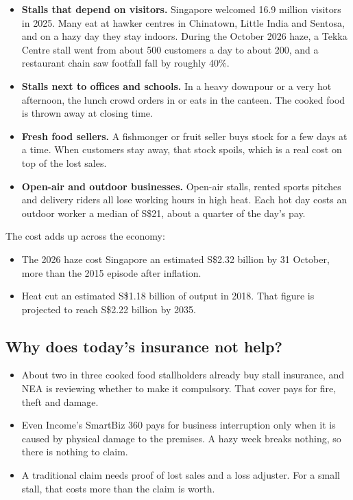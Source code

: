 \documentclass[11pt,a4paper]{article}
\newcommand{\sgd}{\textup{S\$}}
\begin{document}
\begin{itemize}[leftmargin=1.2em]
  \item \textbf{Stalls that depend on visitors.} Singapore welcomed 16.9 million visitors in 2025.\cite{stb} Many eat at hawker centres in Chinatown, Little India and Sentosa, and on a hazy day they stay indoors. During the October 2026 haze, a Tekka Centre stall went from about 500 customers a day to about 200, and a restaurant chain saw footfall fall by roughly 40\%.\cite{st-haze}
  \item \textbf{Stalls next to offices and schools.} In a heavy downpour or a very hot afternoon, the lunch crowd orders in or eats in the canteen. The cooked food is thrown away at closing time.
  \item \textbf{Fresh food sellers.} A fishmonger or fruit seller buys stock for a few days at a time. When customers stay away, that stock spoils, which is a real cost on top of the lost sales.
  \item \textbf{Open-air and outdoor businesses.} Open-air stalls, rented sports pitches and delivery riders all lose working hours in high heat. Each hot day costs an outdoor worker a median of \sgd 21, about a quarter of the day's pay.\cite{heatsafe}
\end{itemize}

The cost adds up across the economy:
\begin{itemize}[leftmargin=1.2em]
  \item The 2026 haze cost Singapore an estimated \sgd 2.32 billion by 31 October, more than the 2015 episode after inflation.\cite{ntu-haze}
  \item Heat cut an estimated \sgd 1.18 billion of output in 2018. That figure is projected to reach \sgd 2.22 billion by 2035.\cite{heatsafe}
\end{itemize}

\subsection{Why does today's insurance not help?}

\begin{itemize}[leftmargin=1.2em]
  \item About two in three cooked food stallholders already buy stall insurance, and NEA is reviewing whether to make it compulsory.\cite{mse-hawker} That cover pays for fire, theft and damage.
  \item Even Income's SmartBiz 360 pays for business interruption only when it is caused by physical damage to the premises.\cite{ps} A hazy week breaks nothing, so there is nothing to claim.
  \item A traditional claim needs proof of lost sales and a loss adjuster. For a small stall, that costs more than the claim is worth.
\end{itemize}
\end{document}
